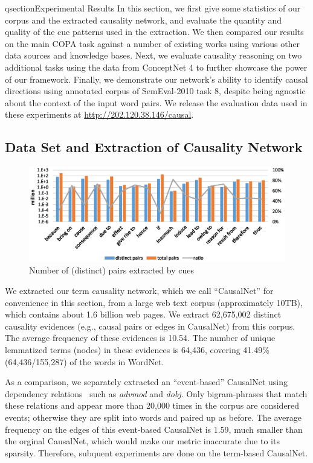 qsection{Experimental Results}
\label{sec:eval}
In this section, we first give some statistics of
our corpus and the extracted causality network, and evaluate the
quantity and quality of the cue patterns used in the extraction.
We then compared our results on the main COPA task against a number of
existing works using various other data sources and knowledge bases.
Next, we evaluate causality reasoning
on two additional tasks using the data from ConceptNet 4 to
further showcase the power of our framework.
Finally, we demonstrate our network's ability to identify causal directions
using annotated corpus of SemEval-2010 task 8, despite being
agnostic about the context of the input word pairs.
We release the evaluation data used in these experiments
at \url{http://202.120.38.146/causal}.

\subsection{Data Set and Extraction of Causality Network}
\label{sec:causalnet}
\begin{figure}[th]
\centering
\includegraphics[width=1.6\columnwidth]{pattern1}
\caption{Number of (distinct) pairs extracted by cues}
\label{fig:pattern1}
\end{figure}
We extracted our term causality network, which we call ``CausalNet''
for convenience in this section, from a large web text corpus (approximately
10TB), %
which contains about 1.6 billion web pages.
We extract 62,675,002 distinct causality evidences (e.g., causal pairs
or edges in CausalNet) from this corpus.
The average frequency of these evidences is 10.54.
The number of unique lemmatized terms (nodes)
in these evidences is 64,436, covering 41.49\% (64,436/155,287) of the
words in WordNet.

As a comparison, we separately extracted an
``event-based'' CausalNet using dependency relations~\cite{chen2014fast}
such as \emph{advmod} and \emph{dobj}.
Only bigram-phrases that match these relations and appear more than
20,000 times in the corpus are considered events; otherwise they are split
into words and paired up as before.
The average frequency on the edges of this event-based CausalNet
is 1.59, much smaller than the orginal CausalNet,
which would make our metric inaccurate due to its sparsity.
Therefore, subquent
experiments are done on the term-based CausalNet.

